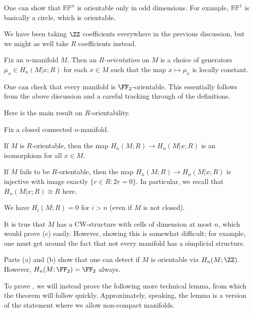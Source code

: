 \documentclass[../notes.tex]{subfiles}
\begin{document}
\begin{example}
	One can show that $\mathbb{RP}^n$ is orientable only in odd dimensions. For example, $\mathbb{RP}^1$ is basically a circle, which is orientable.
\end{example}
We have been taking $\ZZ$ coefficients everywhere in the previous discussion, but we might as well take $R$ coefficients instead.
\begin{defihelper}[$R$-orientation] 
	Fix an $n$-manifold $M$. Then an \textit{$R$-orientation} on $M$ is a choice of generators $\mu_x\in H_n(M|x;R)$ for each $x\in M$ such that the map $x\mapsto\mu_x$ is locally constant.
\end{defihelper}
\begin{remark}
	One can check that every manifold is $\FF_2$-orientable. This essentially follows from the above discussion and a careful tracking through of the definitions.
\end{remark}
Here is the main result on $R$-orientability.
\begin{theorem} \label{thm:orientable-via-homology}
	Fix a closed connected $n$-manifold.
	\begin{listalph}
		\item If $M$ is $R$-orientable, then the map $H_n(M;R)\to H_n(M|x;R)$ is an isomorphism for all $x\in M$.
		\item If $M$ fails to be $R$-orientable, then the map $H_n(M;R)\to H_n(M|x;R)$ is injective with image exactly $\{r\in R:2r=0\}$. In particular, we recall that $H_n(M|x;R)\cong R$ here.
		\item We have $H_i(M;R)=0$ for $i>n$ (even if $M$ is not closed).
	\end{listalph}
\end{theorem}
\begin{remark}
	It is true that $M$ has a CW-structure with cells of dimension at most $n$, which would prove (c) easily. However, showing this is somewhat difficult; for example, one must get around the fact that not every manifold has a simplicial structure.
\end{remark}
\begin{remark}
	Parts (a) and (b) show that one can detect if $M$ is orientable via $H_n(M;\ZZ)$. However, $H_n(M;\FF_2)=\FF_2$ always.
\end{remark}
To prove , we will instead prove the following more technical lemma, from which the theorem will follow quickly. Approximately, speaking, the lemma is a version of the statement where we allow non-compact manifolds.
\end{document}
